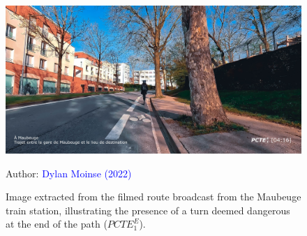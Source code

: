 \begin{refsegment}
\begin{figure}[h!]\vspace*{4pt}
    \caption{Image extracted from the filmed route broadcast from the Maubeuge train station, illustrating the presence of a turn deemed dangerous at the end of the path (\(PCTE^{E}_{1}\)).}
    \label{fig-chap4:pcte1e-partage-voirie}
    \centerline{\includegraphics[width=1\columnwidth]{src/Figures/Chap-4/Extrait_Video_PCTE1_Egress_9.jpg}}
    \vspace{5pt}
    \begin{flushright}\scriptsize{
    Author: \textcolor{blue}{Dylan Moinse (2022)}
    }\end{flushright}
\end{figure}


\end{refsegment}
